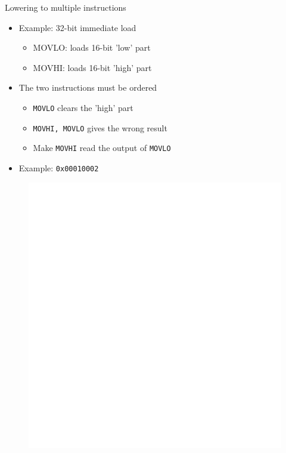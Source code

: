 \begin{frame}{Lowering to multiple instructions}

\begin{minipage}[t]{0.58\linewidth}
    \begin{itemize}
        \item Example: 32-bit immediate load
        \begin{itemize}
            \item MOVLO: loads 16-bit 'low' part
            \item MOVHI: loads 16-bit 'high' part
        \end{itemize}
        
        \item The two instructions must be ordered
        \begin{itemize}
            \item \texttt{MOVLO} clears the 'high' part
            \item \texttt{MOVHI, MOVLO} gives the wrong result
            \item Make \texttt{MOVHI} read the output of \texttt{MOVLO}
        \end{itemize}
        \item Example: \texttt{0x00010002}
    \end{itemize}
\end{minipage}
\begin{minipage}[t]{0.41\linewidth}
    \begin{figure}
        \vspace{-3.5ex}
        \includegraphics[width = 1.00\textwidth]{examples/ex5/ex5-post-isel.pdf}
    \end{figure}
\end{minipage}

\end{frame}

